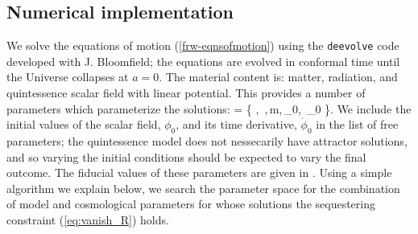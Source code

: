 \documentclass[amsmath,amssymb,10pt,twocolumn,eqsecnum]{revtex4}
\begin{document}
\subsection{Numerical implementation}

We solve the equations of motion (\ref{frw-eqnsofmotion}) using the  {\tt deevolve} code developed with J. Bloomfield; the equations are evolved in conformal time until the Universe collapses at $a=0$.  The material content is: matter, radiation, and quintessence scalar field with linear potential. This provides a number of parameters which  parameterize the solutions: 
\bea
{} = \left\{ , \,,\,m,\,\phi_0, \,\dot{\phi}_0 \right\}.
\eea
We include the initial values of the scalar field, $\phi_0$, and its time derivative, $\dot{\phi}_0$ in the list of free parameters; the quintessence model does not nessecarily have attractor solutions, and so varying the initial conditions should be expected to vary the final outcome. The fiducial values of these parameters are given in . Using a simple algorithm we explain below, we search the parameter space for the combination of model and cosmological parameters for whose solutions the sequestering constraint (\ref{eq:vanish_R}) holds. 
\end{document}
